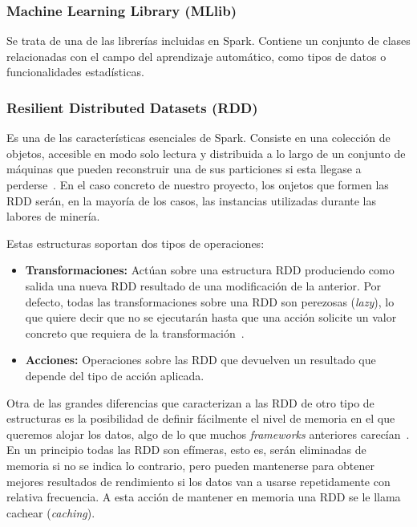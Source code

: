 \subsubsection{Machine Learning Library (MLlib)}\label{MLib}

Se trata de una de las librerías incluidas en Spark. Contiene un conjunto de clases relacionadas con el campo del aprendizaje automático, como tipos de datos o funcionalidades estadísticas.  

\subsubsection{Resilient Distributed Datasets (RDD)}\label{sec:DefRDD}
Es una de las características esenciales de Spark. Consiste en una colección de objetos, accesible en modo solo lectura y distribuida a lo largo de un conjunto de máquinas que pueden reconstruir una de sus particiones si esta llegase a perderse~\cite{SparkPaper}. En el caso concreto de nuestro proyecto, los onjetos que formen las RDD serán, en la mayoría de los casos, las instancias utilizadas durante las labores de minería.

Estas estructuras soportan dos tipos de operaciones:

\begin{itemize}
	\item \textbf{Transformaciones:} Actúan sobre una estructura RDD produciendo como salida una nueva RDD resultado de una modificación de la anterior. Por defecto, todas las transformaciones sobre una RDD son perezosas (\textit{lazy}), lo que quiere decir que no se ejecutarán hasta que una acción solicite un valor concreto que requiera de la transformación~\cite{SparkPaper}.
	\item \textbf{Acciones:} Operaciones sobre las RDD que devuelven un resultado que depende del tipo de acción aplicada.
\end{itemize}

Otra de las grandes diferencias que caracterizan a las RDD de otro tipo de estructuras es la posibilidad de definir fácilmente el nivel de memoria en el que queremos alojar los datos, algo de lo que muchos \textit{frameworks} anteriores carecían~\cite{RDDPaper}. En un principio todas las RDD son efímeras, esto es, serán eliminadas de memoria si no se indica lo contrario, pero pueden mantenerse para obtener mejores resultados de rendimiento si los datos van a usarse repetidamente con relativa frecuencia. A esta acción de mantener en memoria una RDD se le llama cachear (\textit{caching}).

